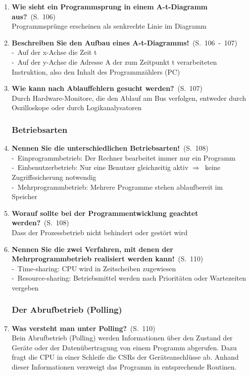 \documentclass[a4paper,12pt]{article}
\newcommand{\question}[3]{\pagebreak[3]\item {\textbf{#1?}}\ (S.\ #2)#3}
\newcommand{\statement}[3]{\pagebreak[3]\item {\textbf{#1!}}\ (S.\ #2)#3}
\newcommand{\catchword}[1]{\\-\ #1}
\newcommand{\normaltext}[1]{\\#1}
\newcommand{\resultol}[1]{$\Rightarrow$\ #1}
\newcommand{\page}[1]{#1}
\newcommand{\pages}[2]{#1\ -\ #2}
\begin{document}
\begin{enumerate}
  \question{Wie sieht ein Programmsprung in einem A-t-Diagramm aus}{\page{106}}
  {
    \normaltext{Programmsprünge erscheinen als senkrechte Linie im Diagramm}
  }

  \statement{Beschreiben Sie den Aufbau eines A-t-Diagramms}{\pages{106}{107}}
  {
    \catchword{Auf der x-Achse die Zeit t}
    \catchword{Auf der y-Achse die Adresse A der zum Zeitpunkt t verarbeiteten Instruktion,
               also den Inhalt des Programmzählers (PC)}
  }

  \question{Wie kann nach Ablauffehlern gesucht werden}{\page{107}}
  {
    \normaltext{Durch Hardware-Monitore, die den Ablauf am Bus verfolgen, entweder durch
                Oszilloskope oder durch Logikanalysatoren}
  }

  \subsubsection{Betriebsarten}

  \statement{Nennen Sie die unterschiedlichen Betriebsarten}{\page{108}}
  {
    \catchword{Einprogrammbetrieb: Der Rechner bearbeitet immer nur ein Programm}
    \catchword{Einbenutzerbetrieb: Nur eine Benutzer gleichzeitig aktiv
               \resultol{keine Zugriffssicherung notwendig}}
    \catchword{Mehrprogrammbetrieb: Mehrere Programme stehen ablaufbereit im Speicher}
  }

  \question{Worauf sollte bei der Programmentwicklung geachtet werden}{\page{108}}
  {
    \normaltext{Dass der Prozessbetrieb nicht behindert oder gestört wird}
  }

  \statement{Nennen Sie die zwei Verfahren, mit denen der Mehrprogrammbetrieb
             realisiert werden kann}{\page{110}}
  {
    \catchword{Time-sharing: CPU wird in Zeitscheiben zugewiesen}
    \catchword{Resource-sharing: Betriebsmittel werden nach Prioritäten oder Wartezeiten vergeben}
  }

  \subsubsection{Der Abrufbetrieb (Polling)}

  \question{Was versteht man unter Polling}{\page{110}}
  {
    \normaltext{Bein Abrufbetrieb (Polling) werden Informationen über den Zustand der Geräte
                oder der Datenübertragung von einem Programm abgerufen. Dazu fragt die CPU in einer Schleife
                die CSRs der Geräteanschlüsse ab. Anhand dieser Informationen verzweigt das Programm in 
                entsprechende Routinen.}
  }


\end{enumerate}
\end{document}
